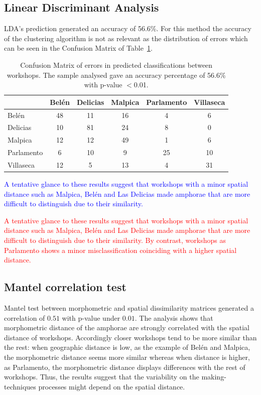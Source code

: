 \documentclass[review]{elsarticle}
\newcommand{\memo}[2]{\textcolor{#1}{#2}}
\newcommand{\maria}[1]{\memo{red}{#1\\}}
\newcommand{\revise}[1]{\memo{blue}{#1\\}}
\begin{document}
\subsection{Linear Discriminant Analysis}

LDA's prediction generated an accuracy of 56.6\%. For this method the accuracy of the clustering algorithm is not as relevant as the distribution of errors which can be seen in the Confusion Matrix of Table~\ref{table:confusion}.

\begin{table}[htp]
\begin{tabular}{lccccc}
\hline
      & Belén & Delicias & Malpica & Parlamento & Villaseca\\ \hline
Belén & 48 & 11 & 16 & 4 & 6 \\
Delicias & 10 & 81 & 24 & 8 & 0 \\
Malpica & 12 & 12 & 49 & 1 & 6 \\
Parlamento & 6 & 10 & 9 & 25 & 10 \\
Villaseca & 12 & 5 & 13 & 4 & 31 \\
\hline

\end{tabular}
\caption{Confusion Matrix of errors in predicted classifications between workshops. The sample analysed gave an accuracy percentage of 56.6\% with p-value $<$0.01. }
\label{table:confusion}
\end{table}

\revise{A tentative glance to these results suggest that workshops with a minor spatial distance such as Malpica, Belén and Las Delicias made amphorae that are more difficult to distinguish due to their similarity.}

\maria{A tentative glance to these results suggest that workshops with a minor spatial distance such as Malpica, Belén and Las Delicias made amphorae that are more difficult to distinguish due to their similarity. By contrast, workshops as Parlamento shows a minor misclassification coinciding with a higher spatial distance.}

\subsection{Mantel correlation test}

Mantel test between morphometric and spatial dissimilarity matrices generated a correlation of $0.51$ with p-value under $0.01$. The analysis shows that morphometric distance of the amphorae are strongly correlated with the spatial distance of workshops. Accordingly closer workshops tend to be more similar than the rest: when geographic distance is low, as the example of Belén and Malpica, the morphometric distance seems more similar whereas when distance is higher, as Parlamento, the morphometric distance displays differences with the rest of workshops. Thus, the results suggest that the variability on the making-techniques processes might depend on the spatial distance.   
\end{document}
